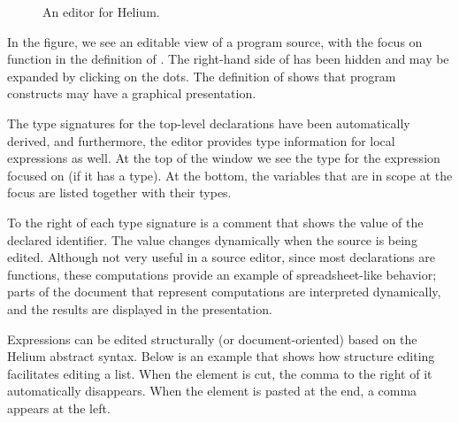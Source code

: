 \begin{figure}
\begin{center}
\caption{An editor for Helium.}\label{heliumMain} 
\end{center}
\end{figure}

In the figure, we see an editable view of a program source, with the focus on function  in the definition of . The right-hand side of  has been hidden and may be expanded by clicking on the dots. The definition of  shows that program constructs may have a graphical presentation.

The type signatures for the top-level declarations have been automatically derived, and furthermore,  the editor provides type information for local expressions as well. At the top of the window we see the type for the expression focused on (if it has a type). At the bottom, the variables that are in scope at the focus are listed together with their types.

To the right of each type signature is a comment that shows the value of the declared identifier. The value changes dynamically when the source is being edited. Although not very useful in a source editor, since most declarations are functions, these computations provide an example of spreadsheet-like behavior; parts of the document that represent computations are interpreted dynamically, and the results are displayed in the presentation.


Expressions can be edited structurally (or document-oriented) based on the Helium abstract syntax. Below is an example that shows how structure editing facilitates editing a list. When the  element is cut, the comma to the right of it automatically disappears. When the element is pasted at the end, a comma appears at the left. 

\newcommand{\protoscrshot}[4]{%
\parbox{#4mm}{\begin{center} \fbox{\epsfigPrx{#1}{#4}{#2}}\\
{\vspace{2mm}\small #3}\end{center}
}}%

\newcommand{\then}{\hspace{\stretch{1}}$\Rightarrow$\hspace{\stretch{1}}}


